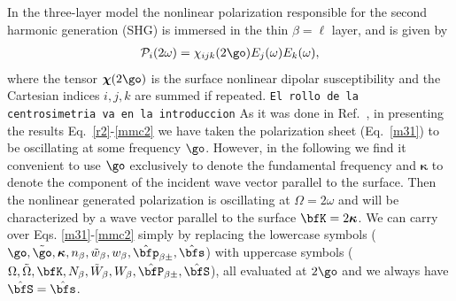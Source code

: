 \documentclass[aps,11pt]{revtex4}
\begin{document}
In the three-layer model the nonlinear polarization responsible for 
the second harmonic generation (SHG) is immersed in the thin $\beta=\ell$
layer, and is given by 
\begin{align}\label{tres}
\mathcal{P}_i(2\omega)=\chi_{ijk}(2\go)E_{j}(\omega)E_{k}(\omega) 
,
\end{align}
where the  
tensor $\boldsymbol{\chi}(2\go)$ is the surface nonlinear  
dipolar susceptibility and the Cartesian indices $i,j,k$ are summed if repeated. 
\verb=El rollo de la centrosimetria va en la introduccion=
As it was done in Ref.~,
in presenting the results Eq.~\eqref{r2}-\eqref{mmc2}
we have taken the
polarization sheet (Eq.~\eqref{m31}) to be oscillating at some frequency
$\go$. However,
 in the following we find it convenient to use $\go$
exclusively to denote the fundamental frequency and
$\boldsymbol{\kappa}$
 to denote the
component of the incident wave vector parallel to the surface. Then
the nonlinear 
generated polarization is oscillating at $\Omega= 2\omega$
and will be characterized
by a wave vector parallel to the surface 
$\bfK=2\boldsymbol{\kappa}$. 
We can carry over
Eqs. \eqref{m31}-\eqref{mmc2} 
simply by replacing the lowercase symbols 
($\go,\tilde\go,\boldsymbol{\kappa},n_\beta,\tilde w_\beta,w_\beta,\hat\bfp_{\beta\pm},\hat\bfs$)  
with uppercase symbols 
($\Omega,\tilde\Omega,\bfK,N_\beta,\tilde W_\beta,W_\beta,\hat\bfP_{\beta\pm},\hat\bfS$),
all evaluated at $2\go$ and
we always have $\hat\bfS=\hat\bfs$.
\end{document}
